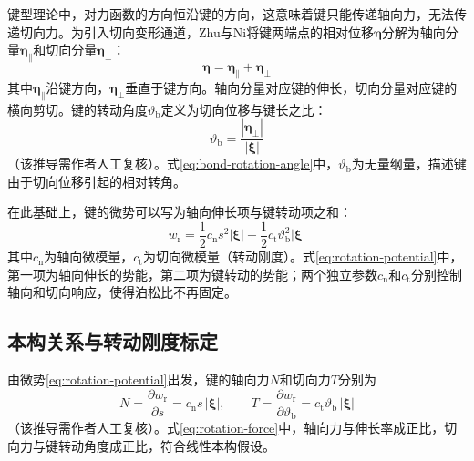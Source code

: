 键型理论中，对力函数的方向恒沿键的方向，这意味着键只能传递轴向力，无法传递切向力。为引入切向变形通道，Zhu与Ni\cite{ZhuNi2017}将键两端点的相对位移$\boldsymbol{\eta}$分解为轴向分量$\boldsymbol{\eta}_{\parallel}$和切向分量$\boldsymbol{\eta}_{\perp}$：
\begin{equation}
  \boldsymbol{\eta}=\boldsymbol{\eta}_{\parallel}+\boldsymbol{\eta}_{\perp}
  \label{eq:displacement-decomp}
\end{equation}
其中$\boldsymbol{\eta}_{\parallel}$沿键方向，$\boldsymbol{\eta}_{\perp}$垂直于键方向。轴向分量对应键的伸长，切向分量对应键的横向剪切。键的转动角度$\vartheta_{\mathrm{b}}$定义为切向位移与键长之比：
\begin{equation}
  \vartheta_{\mathrm{b}}=\frac{|\boldsymbol{\eta}_{\perp}|}{|\boldsymbol{\xi}|}
  \label{eq:bond-rotation-angle}
\end{equation}
（该推导需作者人工复核）。式\eqref{eq:bond-rotation-angle}中，$\vartheta_{\mathrm{b}}$为无量纲量，描述键由于切向位移引起的相对转角。

在此基础上，键的微势可以写为轴向伸长项与键转动项之和：
\begin{equation}
  w_{\mathrm{r}}=\frac{1}{2}c_{\mathrm{n}}s^{2}|\boldsymbol{\xi}|+\frac{1}{2}c_{\mathrm{t}}\vartheta_{\mathrm{b}}^{2}|\boldsymbol{\xi}|
  \label{eq:rotation-potential}
\end{equation}
其中$c_{\mathrm{n}}$为轴向微模量，$c_{\mathrm{t}}$为切向微模量（转动刚度）。式\eqref{eq:rotation-potential}中，第一项为轴向伸长的势能，第二项为键转动的势能；两个独立参数$c_{\mathrm{n}}$和$c_{\mathrm{t}}$分别控制轴向和切向响应，使得泊松比不再固定。


\subsection{本构关系与转动刚度标定}\label{sec:rotation-constitutive}

由微势\eqref{eq:rotation-potential}出发，键的轴向力$N$和切向力$T$分别为
\begin{equation}
  N=\frac{\partial w_{\mathrm{r}}}{\partial s}=c_{\mathrm{n}}s\,|\boldsymbol{\xi}|,
  \qquad
  T=\frac{\partial w_{\mathrm{r}}}{\partial\vartheta_{\mathrm{b}}}=c_{\mathrm{t}}\vartheta_{\mathrm{b}}\,|\boldsymbol{\xi}|
  \label{eq:rotation-force}
\end{equation}
（该推导需作者人工复核）。式\eqref{eq:rotation-force}中，轴向力与伸长率成正比，切向力与键转动角度成正比，符合线性本构假设。

